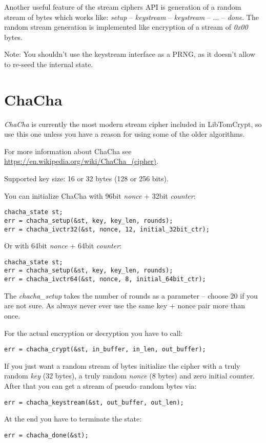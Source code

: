 \documentclass[synpaper]{book}
\newcommand{\mysection}[1]    %
	{                   %
	\section{#1}
   \markboth{\textsf{www.libtom.net}}{\thesection ~ {#1}}
	}
\begin{document}
Another useful feature of the stream ciphers API is generation of a random stream of bytes which works like:
\textit{setup} -- \textit{keystream} -- \textit{keystream} -- ... -- \textit{done}. The random stream generation is
implemented like encryption of a stream of \textit{0x00} bytes.

Note: You shouldn't use the keystream interface as a PRNG, as it doesn't allow to re-seed the internal state.

\mysection{ChaCha}

\textit{ChaCha} is currently the most modern stream cipher included in LibTomCrypt, so use this one unless you
have a reason for using some of the older algorithms.

For more information about ChaCha see \url{https://en.wikipedia.org/wiki/ChaCha_(cipher)}.

Supported key size: 16 or 32 bytes (128 or 256 bits).

You can initialize ChaCha with 96bit \textit{nonce} + 32bit \textit{counter}:
\begin{verbatim}
chacha_state st;
err = chacha_setup(&st, key, key_len, rounds);
err = chacha_ivctr32(&st, nonce, 12, initial_32bit_ctr);
\end{verbatim}

Or with 64bit \textit{nonce} + 64bit \textit{counter}:
\begin{verbatim}
chacha_state st;
err = chacha_setup(&st, key, key_len, rounds);
err = chacha_ivctr64(&st, nonce, 8, initial_64bit_ctr);
\end{verbatim}

The \textit{chacha\_setup} takes the number of rounds as a parameter -- choose 20 if you are not sure.
As always never ever use the same key + nonce pair more than once.

For the actual encryption or decryption you have to call:
\begin{verbatim}
err = chacha_crypt(&st, in_buffer, in_len, out_buffer);
\end{verbatim}

If you just want a random stream of bytes initialize the cipher with a truly random \textit{key} (32 bytes),
a truly random \textit{nonce} (8 bytes) and zero initial counter. After that you can get a stream of pseudo--random
bytes via:
\begin{verbatim}
err = chacha_keystream(&st, out_buffer, out_len);
\end{verbatim}

At the end you have to terminate the state:
\begin{verbatim}
err = chacha_done(&st);
\end{verbatim}
\end{document}
